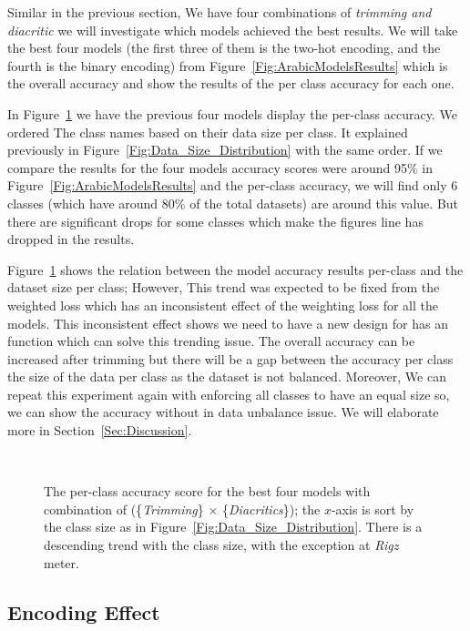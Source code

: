 Similar in the previous section, We have four combinations of \textit{trimming and diacritic} we will investigate which models achieved the best results. We will take the best four models (the first three of them is the two-hot encoding, and the fourth is the binary encoding) from Figure~\ref{Fig:ArabicModelsResults} which is the overall accuracy and show the results of the per class accuracy for each one.

In Figure~\ref{Fig:Results_Per_Class} we have the previous four models display the per-class accuracy. We ordered The class names based on their data size per class. It explained previously in Figure~\ref{Fig:Data_Size_Distribution} with the same order. If we compare the results for the four models accuracy scores were around 95\% in Figure~\ref{Fig:ArabicModelsResults} and the per-class accuracy, we will find only 6 classes (which have around 80\% of the total datasets) are around this value. But there are significant drops for some classes which make the figures line has dropped in the results.

Figure~\ref{Fig:Results_Per_Class} shows the relation between the model accuracy results per-class and the dataset size per class; However, This trend was expected to be fixed from the weighted loss which has an inconsistent effect of the weighting loss for all the models. This inconsistent effect shows we need to have a new design for has an function which can solve this trending issue. The overall accuracy can be increased after trimming but there will be a gap between the accuracy per class the size of the data per class as the dataset is not balanced. Moreover, We can repeat this experiment again with enforcing all classes to have an equal size so, we can show the accuracy without in data unbalance issue. We will elaborate more in Section~\ref{Sec:Discussion}.



\begin{figure}[!t]
 
 \caption{The per-class accuracy score for the best four models with combination of (\{\textit{Trimming}\} $\times$ \{\textit{Diacritics}\}); the $x$-axis is sort by the class size as in Figure~\ref{Fig:Data_Size_Distribution}. There is a descending trend with the class size, with the exception at \textit{Rigz} meter.}~\label{Fig:Results_Per_Class}
\end{figure}



\subsection{Encoding Effect}

